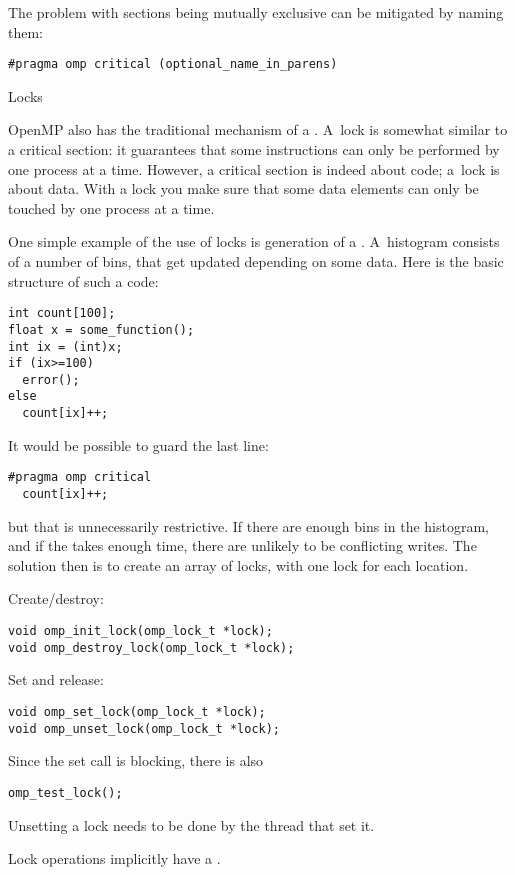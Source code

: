 The problem with  sections being mutually exclusive can be mitigated by naming them:
\begin{lstlisting}
#pragma omp critical (optional_name_in_parens)
\end{lstlisting}


 {Locks}
\label{sec:ompref:locks}

OpenMP also has the traditional mechanism of a . A~lock is somewhat similar to 
a critical section: it guarantees that some instructions can only be performed by one
process at a time. However, a critical section is indeed about code; a~lock is about data.
With a lock you make sure that some data elements can only be touched by one process at a time.

One simple example of the use of locks is generation of a .
A~histogram consists of a number of bins, that get updated depending on some data.
Here is the basic structure of such a code:
\begin{lstlisting}
int count[100];
float x = some_function();
int ix = (int)x;
if (ix>=100)
  error();
else
  count[ix]++;
\end{lstlisting}
It would be possible to guard the last line:
\begin{lstlisting}
#pragma omp critical
  count[ix]++;
\end{lstlisting}
but that is unnecessarily restrictive. If there are enough bins in the
histogram, and if the  takes enough time, there are unlikely to be
conflicting writes. The solution then is to create an array of locks, with
one lock for each  location.

Create/destroy:
\begin{lstlisting}
void omp_init_lock(omp_lock_t *lock);
void omp_destroy_lock(omp_lock_t *lock);
\end{lstlisting}
Set and release:
\begin{lstlisting}
void omp_set_lock(omp_lock_t *lock);
void omp_unset_lock(omp_lock_t *lock);
\end{lstlisting}
Since the set call is blocking, there is also 
\begin{lstlisting}
omp_test_lock();
\end{lstlisting}

Unsetting a lock needs to be done by the thread that set it.

Lock operations implicitly have a .

